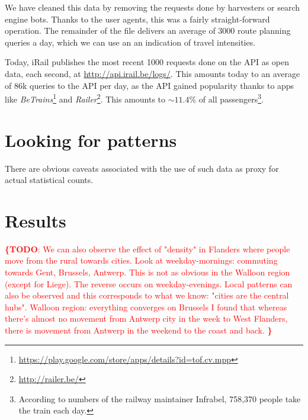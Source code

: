\documentclass{sig-alternate}
\newcommand{\todo}[1]{\noindent\textcolor{red}{{\bf \{TODO}: #1{\bf \}}}}
\begin{document}
We have cleaned this data by removing the requests done by harvesters or search engine bots.
Thanks to the user agents, this was a fairly straight-forward operation.
The remainder of the file delivers an average of 3000 route planning queries a day, which we can use an an indication of travel intensities.

Today, iRail publishes the most recent 1000 requests done on the API as open data, each second, at \url{http://api.irail.be/logs/}.
This amounts today to an average of 86k queries to the API per day, as the API gained popularity thanks to apps like \emph{BeTrains}\footnote{\url{https://play.google.com/store/apps/details?id=tof.cv.mpp}} and \emph{Railer}\footnote{\url{http://railer.be/}}.
This amounts to $\sim11.4\%$ of all passengers\footnote{According to numbers of the railway maintainer Infrabel, 758,370 people take the train each day.}.

\section{Looking for patterns}
\label{sec:method}

There are obvious caveats associated with the use of such data as proxy for actual statistical counts.

\section{Results}
\label{sec:results}

\todo{
We can also observe the effect of "density" in Flanders where people move from the rural towards cities. Look at weekday-mornings: commuting towards Gent, Brussels, Antwerp. This is not as obvious in the Walloon region (except for Liege). The reverse occurs on weekday-evenings. Local patterns can also be observed and this corresponds to what we know: "cities are the central hubs".
Walloon region: everything converges on Brussels
I found that whereas there's almost no movement from Antwerp city in the week to West Flanders, there is movement from Antwerp in the weekend to the coast and back. 
}
\end{document}
